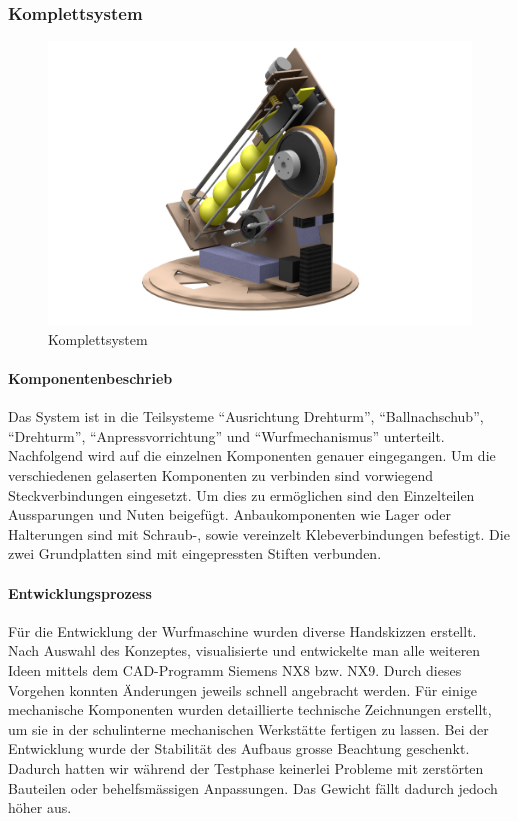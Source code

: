 \subsubsection{Komplettsystem}
\begin{figure}[h!]
	\centering
	\includegraphics[width=\linewidth]{../../fig/Render_Komplettsystem_5}
	\caption{Komplettsystem}
	\label{fig:Komplettsystem}
\end{figure}
\paragraph{Komponentenbeschrieb\\}
Das System ist in die Teilsysteme "`Ausrichtung Drehturm"', "`Ballnachschub"', "`Drehturm"', "`Anpressvorrichtung"' und "`Wurfmechanismus"' unterteilt. Nachfolgend wird auf die einzelnen Komponenten genauer eingegangen. Um die verschiedenen gelaserten Komponenten zu verbinden sind vorwiegend Steckverbindungen eingesetzt. Um dies zu ermöglichen sind den Einzelteilen Aussparungen und Nuten beigefügt. Anbaukomponenten wie Lager oder Halterungen sind mit Schraub-, sowie vereinzelt Klebeverbindungen befestigt. Die zwei Grundplatten sind mit eingepressten Stiften verbunden.

\paragraph{Entwicklungsprozess\\}
Für die Entwicklung der Wurfmaschine wurden diverse Handskizzen erstellt. Nach Auswahl des Konzeptes, visualisierte und entwickelte man alle weiteren Ideen mittels dem CAD-Programm Siemens NX8 bzw. NX9. Durch dieses Vorgehen konnten Änderungen jeweils schnell angebracht werden. Für einige mechanische Komponenten wurden detaillierte technische Zeichnungen erstellt, um sie in der schulinterne mechanischen Werkstätte fertigen zu lassen. Bei der Entwicklung wurde der Stabilität des Aufbaus grosse Beachtung geschenkt. Dadurch hatten wir während der Testphase keinerlei Probleme mit zerstörten Bauteilen oder behelfsmässigen Anpassungen. Das Gewicht fällt dadurch jedoch höher aus. 